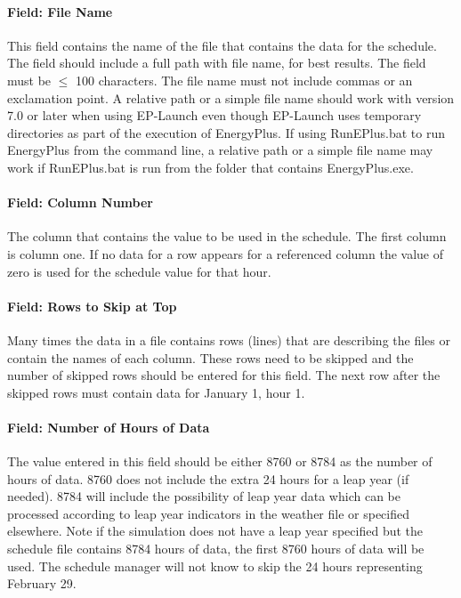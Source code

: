 \paragraph{Field: File Name}\label{schedulefile-field-file-name}

This field contains the name of the file that contains the data for the schedule. The field should include a full path with file name, for best results. The field must be \(\le\) 100 characters. The file name must not include commas or an exclamation point. A relative path or a simple file name should work with version 7.0 or later when using EP-Launch even though EP-Launch uses temporary directories as part of the execution of EnergyPlus. If using RunEPlus.bat to run EnergyPlus from the command line, a relative path or a simple file name may work if RunEPlus.bat is run from the folder that contains EnergyPlus.exe.

\paragraph{Field: Column Number}\label{field-column-number}

The column that contains the value to be used in the schedule. The first column is column one. If no data for a row appears for a referenced column the value of zero is used for the schedule value for that hour.

\paragraph{Field: Rows to Skip at Top}\label{field-rows-to-skip-at-top}

Many times the data in a file contains rows (lines) that are describing the files or contain the names of each column. These rows need to be skipped and the number of skipped rows should be entered for this field. The next row after the skipped rows must contain data for January 1, hour 1.

\paragraph{Field: Number of Hours of Data}\label{field-number-of-hours-of-data}

The value entered in this field should be either 8760 or 8784 as the number of hours of data. 8760 does not include the extra 24 hours for a leap year (if needed). 8784 will include the possibility of leap year data which can be processed according to leap year indicators in the weather file or specified elsewhere. Note if the simulation does not have a leap year specified but the schedule file contains 8784 hours of data, the first 8760 hours of data will be used. The schedule manager will not know to skip the 24 hours representing February 29.


